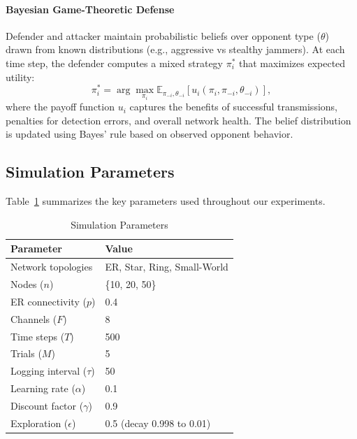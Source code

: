 \documentclass[conference]{IEEEtran}
\begin{document}
\paragraph{Bayesian Game-Theoretic Defense}
Defender and attacker maintain probabilistic beliefs over opponent type ($\theta$) drawn from known distributions (e.g., aggressive vs stealthy jammers). At each time step, the defender computes a mixed strategy $\pi_i^*$ that maximizes expected utility:
\[
\pi_i^* = \arg\max_{\pi_i} \mathbb{E}_{\pi_{-i},\theta_{-i}}[u_i(\pi_i,\pi_{-i},\theta_{-i})],
\]
where the payoff function $u_i$ captures the benefits of successful transmissions, penalties for detection errors, and overall network health. The belief distribution is updated using Bayes' rule based on observed opponent behavior.

\subsection{Simulation Parameters}
Table~\ref{tab:params} summarizes the key parameters used throughout our experiments.

\begin{table}[h]
\centering
\caption{Simulation Parameters}
\label{tab:params}
\begin{tabular}{@{}ll@{}}
\toprule
Parameter                    & Value                          \\ \midrule
Network topologies           & ER, Star, Ring, Small-World    \\
Nodes ($n$)                  & \{10, 20, 50\}                 \\
ER connectivity ($p$)        & 0.4                            \\
Channels ($F$)               & 8                              \\
Time steps ($T$)             & 500                            \\
Trials ($M$)                 & 5                              \\
Logging interval ($\tau$)    & 50                             \\
Learning rate ($\alpha$)     & 0.1                            \\
Discount factor ($\gamma$)   & 0.9                            \\
Exploration ($\epsilon$)     & 0.5 (decay 0.998 to 0.01)      \\
\bottomrule
\end{tabular}
\end{table}
\end{document}
